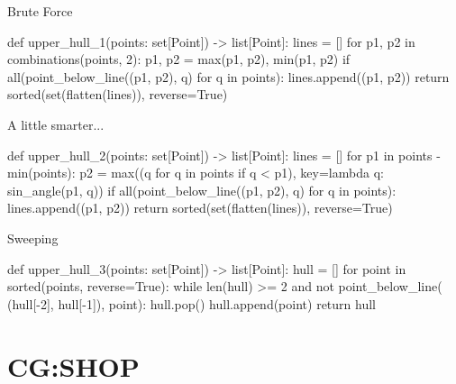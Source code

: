 \documentclass[aspectratio=169]{beamer}
\begin{document}
\ifelsehandout{
    
}{
    
}

\begin{frame}[fragile]{Brute Force}
    \begin{pycode}
def upper_hull_1(points: set[Point]) -> list[Point]:
    lines = []
    for p1, p2 in combinations(points, 2):
        p1, p2 = max(p1, p2), min(p1, p2)
        if all(point_below_line((p1, p2), q)
               for q in points):
            lines.append((p1, p2))
    return sorted(set(flatten(lines)), reverse=True)
    \end{pycode}
\end{frame}

\ifelsehandout{
    
    
}{
    
}

\begin{frame}[fragile]{A little smarter...}
    \begin{pycode}
def upper_hull_2(points: set[Point]) -> list[Point]:
    lines = []
    for p1 in points - {min(points)}:
        p2 = max((q for q in points if q < p1),
                  key=lambda q: sin_angle(p1, q))
        if all(point_below_line((p1, p2), q)
               for q in points):
            lines.append((p1, p2))
    return sorted(set(flatten(lines)), reverse=True)
    \end{pycode}
\end{frame}

\ifelsehandout{
    
}{
    
}

\begin{frame}[fragile]{Sweeping}
    \begin{pycode}
def upper_hull_3(points: set[Point]) -> list[Point]:
    hull = []
    for point in sorted(points, reverse=True):
        while len(hull) >= 2 and
              not point_below_line(
                (hull[-2], hull[-1]), point):
            hull.pop()
        hull.append(point)
    return hull
    \end{pycode}
\end{frame}

\section{CG:SHOP}
\frame{\sectionpage}
\end{document}
